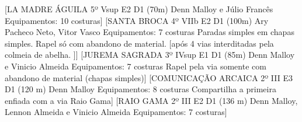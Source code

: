 \begin{CGSectorRoutes}
    [LA MADRE ÁGUILA 5º Vsup E2 D1 (70m) Denn Malloy e Júlio Francês Equipamentos: 10 costuras]
    [SANTA BROCA 4º VIIb E2 D1 (100m) Ary Pacheco Neto, Vitor Vasco Equipamentos: 7 costuras Paradas simples em chapas simples. Rapel só com abandono de material. [após 4 vias interditadas pela colmeia de abelha. ]]
    [JUREMA SAGRADA 3º IVsup E1 D1 (85m) Denn Malloy e Vinicio Almeida Equipamentos: 7 costuras Rapel pela via somente com abandono de material (chapas simples)]
    [COMUNICAÇÃO ARCAICA 2º III E3 D1 (120 m) Denn Malloy Equipamentos: 8 costuras Compartilha a primeira enfiada com a via Raio Gama]
    [RAIO GAMA 2º III E2 D1 (136 m) Denn Malloy, Lennon Almeida e Vinicio Almeida Equipamentos: 7 costuras]
\end{CGSectorRoutes}

